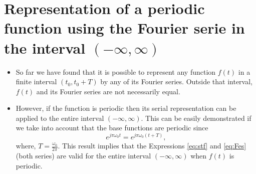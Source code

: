 \begin{comment}
\section{Relation between the Fourier exponential and trigonometric series}
\begin{itemize}
\item Ambas series son dos formas diferentes de expresar la misma
  serie. De hecho se pueden obtener los coeficientes de una de las
  series a partir de los de la otra.
\item Si tomamos que
  $$
  \begin{array}{l}
    a_0 = F_0\\
    a_n = F_{n}+F_{-n}\\
    b_n = j(F_{n}-F_{-n})
  \end{array}
  $$
  se deduce que
  \begin{equation}
    F_n = \frac{1}{2}(a_n-jb_n).
  \end{equation}
  Por lo que es posible pasar de unos coeficientes a otros utilizando
  estas expresiones.
\end{itemize}
\end{comment}

\section{Representation of a periodic function using the Fourier serie in the interval $(-\infty, \infty)$}
\begin{itemize}
\item So far we have found that it is possible to represent any
  function $f(t)$ in a finite interval $(t_0, t_0+T)$ by any of its
  Fourier series. Outside that interval, $f(t)$ and its Fourier series
  are not necessarily equal.
\item However, if the function is periodic then its serial
  representation can be applied to the entire interval $(-\infty,
  \infty)$. This can be easily demonstrated if we take into account
  that the base functions are periodic since
  \begin{equation*}
    e^{j\pi \omega_0t} = e^{j\pi \omega_0(t+T)},
  \end{equation*}
  where, $T=\frac{\omega_0}{2\pi}$. This result implies that the
  Expressions \ref{eq:stf} and \ref{eq:Fes} (both series) are valid
  for the entire interval $(-\infty, \infty)$ when $f(t)$ is periodic.
\end{itemize}

